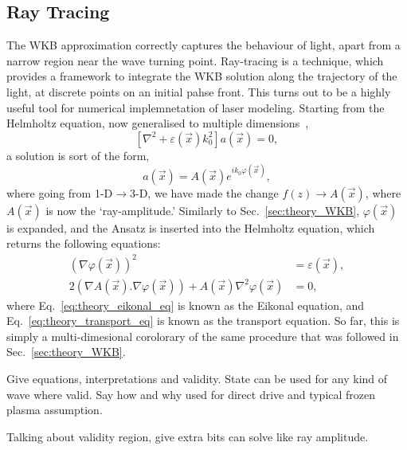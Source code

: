 \subsection{Ray Tracing}%
\label{sec:theory_rays}

The WKB approximation correctly captures the behaviour of light, apart from a narrow region near the wave turning point.
Ray-tracing is a technique, which provides a framework to integrate the WKB solution along the trajectory of the light, at discrete points on an initial pahse front.
This turns out to be a highly useful tool for numerical implemnetation of laser modeling.
Starting from the Helmholtz equation, now generalised to multiple dimensions~\cite{colaitis_modeling_2014},
\begin{equation}
    \left[ \nabla^2 + \varepsilon(\vec{x})k_0^2 \right] a(\vec{x}) = 0,
\end{equation}
a solution is sort of the form,
\begin{equation}
    a(\vec{x}) = A(\vec{x}) e^{i k_0 \varphi(\vec{x})},
\end{equation}
where going from 1-D$\rightarrow$3-D, we have made the change $f(z)\rightarrow A(\vec{x})$, where $A(\vec{x})$ is now the `ray-amplitude.'
Similarly to Sec.~\ref{sec:theory_WKB}, $\varphi(\vec{x})$ is expanded, and the Ansatz is inserted into the Helmholtz equation, which returns the following equations:
\begin{align}
    \label{eq:theory_eikonal_eq}
    \left(\nabla \varphi(\vec{x})\right)^2 &= \varepsilon(\vec{x}),\\
    \label{eq:theory_transport_eq}
    2\left(\nabla A(\vec{x}) . \nabla \varphi (\vec{x}) \right) + A(\vec{x}) \nabla^2 \varphi(\vec{x}) &= 0,
\end{align}
where Eq.~\ref{eq:theory_eikonal_eq} is known as the Eikonal equation, and Eq.~\ref{eq:theory_transport_eq} is known as the transport equation.
So far, this is simply a multi-dimesional corolorary of the same procedure that was followed in Sec.~\ref{sec:theory_WKB}.

Give equations, interpretations and validity.
State can be used for any kind of wave where valid.
Say how and why used for direct drive and typical frozen plasma assumption.

Talking about validity region, give extra bits can solve like ray amplitude.

